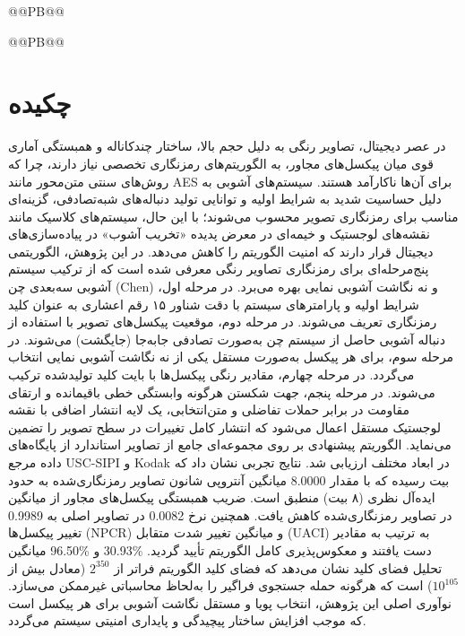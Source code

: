 @@PB@@

 


@@PB@@






\setcounter{page}{1}





\chapter*{چکیده}
در عصر دیجیتال، تصاویر رنگی به دلیل حجم بالا، ساختار چندکاناله و همبستگی آماری قوی میان پیکسل‌های مجاور، به الگوریتم‌های رمزنگاری تخصصی نیاز دارند، چرا که روش‌های سنتی متن‌محور مانند ‎AES‎ برای آن‌ها ناکارآمد هستند. سیستم‌های آشوبی به دلیل حساسیت شدید به شرایط اولیه و توانایی تولید دنباله‌های شبه‌تصادفی، گزینه‌ای مناسب برای رمزنگاری تصویر محسوب می‌شوند؛ با این حال، سیستم‌های کلاسیک مانند نقشه‌های لوجستیک و خیمه‌ای در معرض پدیده «تخریب آشوب» در پیاده‌سازی‌های دیجیتال قرار دارند که امنیت الگوریتم را کاهش می‌دهد. در این پژوهش، الگوریتمی پنج‌مرحله‌ای برای رمزنگاری تصاویر رنگی معرفی شده است که از ترکیب سیستم آشوبی سه‌بعدی چن (‎Chen‎) و نه نگاشت آشوبی نمایی بهره می‌برد. در مرحله اول، شرایط اولیه و پارامترهای سیستم با دقت شناور ۱۵ رقم اعشاری به عنوان کلید رمزنگاری تعریف می‌شوند. در مرحله دوم، موقعیت پیکسل‌های تصویر با استفاده از دنباله آشوبی حاصل از سیستم چن به‌صورت تصادفی جابه‌جا (جایگشت) می‌شوند. در مرحله سوم، برای هر پیکسل به‌صورت مستقل یکی از نه نگاشت آشوبی نمایی انتخاب می‌گردد. در مرحله چهارم، مقادیر رنگی پیکسل‌ها با بایت کلید تولیدشده ترکیب می‌شوند. در مرحله پنجم، جهت شکستن هرگونه وابستگی خطی باقیمانده و ارتقای مقاومت در برابر حملات تفاضلی و متن‌انتخابی، یک لایه انتشار اضافی با نقشه لوجستیک مستقل اعمال می‌شود که انتشار کامل تغییرات در سطح تصویر را تضمین می‌نماید. الگوریتم پیشنهادی بر روی مجموعه‌ای جامع از تصاویر استاندارد از پایگاه‌های داده مرجع ‎USC-SIPI‎ و ‎Kodak‎ در ابعاد مختلف ارزیابی شد. نتایج تجربی نشان داد که میانگین آنتروپی شانون تصاویر رمزنگاری‌شده به حدود ‎8.0000‎ بیت رسیده که با مقدار ایده‌آل نظری (۸ بیت) منطبق است. ضریب همبستگی پیکسل‌های مجاور از میانگین ‎0.9989‎ در تصاویر اصلی به ‎0.0082‎ در تصاویر رمزنگاری‌شده کاهش یافت. همچنین نرخ تغییر پیکسل‌ها (‎NPCR‎) و میانگین تغییر شدت متقابل (‎UACI‎) به ترتیب به مقادیر میانگین ‎96.50\%‎ و ‎30.93\%‎ دست یافتند و معکوس‌پذیری کامل الگوریتم تأیید گردید. تحلیل فضای کلید نشان می‌دهد که فضای کلید الگوریتم فراتر از $2^{350}$ (معادل بیش از $10^{105}$) است که هرگونه حمله جستجوی فراگیر را به‌لحاظ محاسباتی غیرممکن می‌سازد. نوآوری اصلی این پژوهش، انتخاب پویا و مستقل نگاشت آشوبی برای هر پیکسل است که موجب افزایش ساختار پیچیدگی و پایداری امنیتی سیستم می‌گردد.

